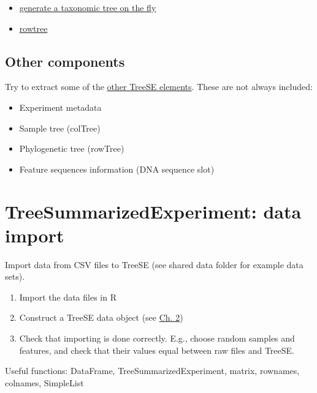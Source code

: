 \documentclass[
]{book}
\providecommand{\tightlist}{%
  \setlength{\itemsep}{0pt}\setlength{\parskip}{0pt}}
\begin{document}
\begin{itemize}
\tightlist
\item
  \href{https://microbiome.github.io/OMA/taxonomic-information.html\#generate-a-taxonomic-tree-on-the-fly}{generate a taxonomic tree on the fly}
\item
  \href{https://microbiome.github.io/OMA/containers.html\#rowtree}{rowtree}
\end{itemize}

\hypertarget{other-components}{%
\subsection{Other components}\label{other-components}}

Try to extract some of the \href{https://f1000research.com/articles/9-1246/v2}{other TreeSE elements}. These are not always included:

\begin{itemize}
\tightlist
\item
  Experiment metadata
\item
  Sample tree (colTree)
\item
  Phylogenetic tree (rowTree)
\item
  Feature sequences information (DNA sequence slot)
\end{itemize}

\hypertarget{treesummarizedexperiment-data-import}{%
\section{TreeSummarizedExperiment: data import}\label{treesummarizedexperiment-data-import}}

Import data from CSV files to TreeSE (see shared data folder for example data sets).

\begin{enumerate}
\def\labelenumi{\arabic{enumi}.}
\tightlist
\item
  Import the data files in R
\item
  Construct a TreeSE data object (see \href{https://microbiome.github.io/OMA/containers.html\#loading-experimental-microbiome-data}{Ch. 2})
\item
  Check that importing is done correctly. E.g., choose random samples and features,
  and check that their values equal between raw files and TreeSE.
\end{enumerate}

Useful functions: DataFrame, TreeSummarizedExperiment, matrix, rownames, colnames, SimpleList
\end{document}
